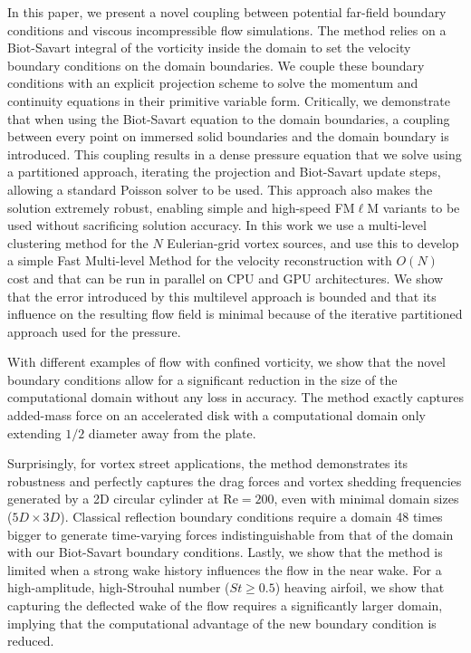 \documentclass[final,1p,times]{elsarticle}
\begin{document}
In this paper, we present a novel coupling between potential far-field boundary conditions and viscous incompressible flow simulations. The method relies on a Biot-Savart integral of the vorticity inside the domain to set the velocity boundary conditions on the domain boundaries. We couple these boundary conditions with an explicit projection scheme to solve the momentum and continuity equations in their primitive variable form. Critically, we demonstrate that when using the Biot-Savart equation to the domain boundaries, a coupling between every point on immersed solid boundaries and the domain boundary is introduced. This coupling results in a dense pressure equation that we solve using a partitioned approach, iterating the projection and Biot-Savart update steps, allowing a standard Poisson solver to be used. This approach also makes the solution extremely robust, enabling simple and high-speed FM$\ell$M variants to be used without sacrificing solution accuracy. In this work we use a multi-level clustering method for the $N$ Eulerian-grid vortex sources, and use this to develop a simple Fast Multi-level Method for the velocity reconstruction with $O(N)$ cost and that can be run in parallel on CPU and GPU architectures. We show that the error introduced by this multilevel approach is bounded and that its influence on the resulting flow field is minimal because of the iterative partitioned approach used for the pressure.

With different examples of flow with confined vorticity, we show that the novel boundary conditions allow for a significant reduction in the size of the computational domain without any loss in accuracy. The method exactly captures added-mass force on an accelerated disk with a computational domain only extending $1/2$ diameter away from the plate. 

Surprisingly, for vortex street applications, the method demonstrates its robustness and perfectly captures the drag forces and vortex shedding frequencies generated by a 2D circular cylinder at $\text{Re}=200$, even with minimal domain sizes ($5D\times3D$). Classical reflection boundary conditions require a domain 48 times bigger to generate time-varying forces indistinguishable from that of the domain with our Biot-Savart boundary conditions. Lastly, we show that the method is limited when a strong wake history influences the flow in the near wake. For a high-amplitude, high-Strouhal number ($St\ge0.5$) heaving airfoil, we show that capturing the deflected wake of the flow requires a significantly larger domain, implying that the computational advantage of the new boundary condition is reduced.
\end{document}
